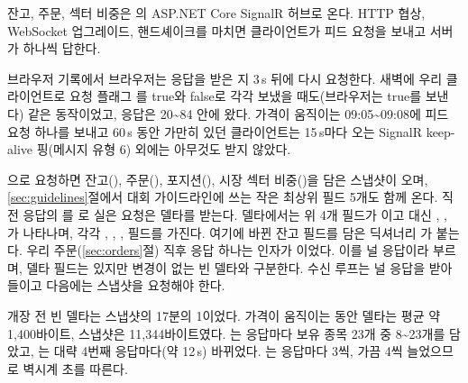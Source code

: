 \seclabel
{}

 잔고, 주문, 섹터 비중은 의 ASP.NET Core SignalR 허브로 온다. HTTP 협상, WebSocket 업그레이드, 핸드셰이크를 마치면 클라이언트가 피드 요청을 보내고 서버가 하나씩 답한다.



 브라우저 기록에서 브라우저는 응답을 받은 지 3\,s 뒤에 다시 요청한다. 새벽에 우리 클라이언트로 요청 플래그 를 true와 false로 각각 보냈을 때도(브라우저는 true를 보낸다) 같은 동작이었고, 응답은 20\textasciitilde 84\ms{} 안에 왔다. 가격이 움직이는 09:05\textasciitilde 09:08에 피드 요청 하나를 보내고 60\,s 동안 가만히 있던 클라이언트는 15\,s마다 오는 SignalR keep-alive 핑(메시지 유형 6) 외에는 아무것도 받지 않았다.

 으로 요청하면 잔고(), 주문(), 포지션(), 시장 섹터 비중()을 담은 스냅샷이 오며, \ref{sec:guidelines}절에서 대회 가이드라인에 쓰는 작은 최상위 필드 5개도 함께 온다. 직전 응답의 를 로 실은 요청은 델타를 받는다. 델타에서는 위 4개 필드가 이고 대신 , , 가 나타나며, 각각 , , ,  필드를 가진다. 여기에 바뀐 잔고 필드를 담은 딕셔너리 가 붙는다. 우리 주문(\ref{sec:orders}절) 직후 응답 하나는 인자가 이었다. 이를 널 응답이라 부르며, 델타 필드는 있지만 변경이 없는 빈 델타와 구분한다. 수신 루프는 널 응답을 받아들이고 다음에는 스냅샷을 요청해야 한다.



 개장 전 빈 델타는 스냅샷의 17분의 1이었다. 가격이 움직이는 동안 델타는 평균 약 1,400바이트, 스냅샷은 11,344바이트였다. 는 응답마다 보유 종목 23개 중 8\textasciitilde 23개를 담았고, 는 대략 4번째 응답마다(약 12\,s) 바뀌었다. 는 응답마다 3씩, 가끔 4씩 늘었으므로 벽시계 초를 따른다.


